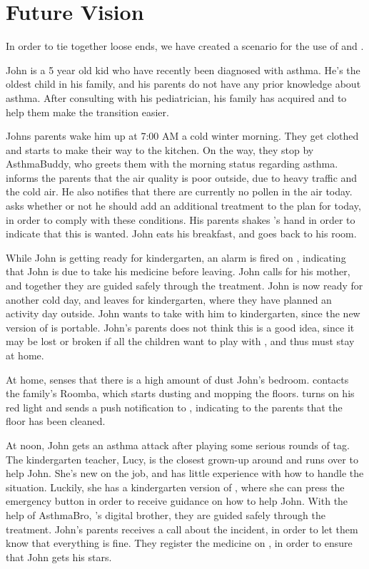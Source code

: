 \section{Future Vision}
\label{sec:futurevision}

In order to tie together loose ends, we have created a scenario for the use of \app{} and \buddy{}.

John is a 5 year old kid who have recently been diagnosed with asthma. He's the oldest child in his family, and his parents do not have any prior knowledge about asthma. After consulting with his pediatrician, his family has acquired \buddy{} and \app{} to help them make the transition easier. 

Johns parents wake him up at 7:00 AM a cold winter morning. They get clothed and starts to make their way to the kitchen. On the way, they stop by AsthmaBuddy, who greets them with the morning status regarding asthma. \buddy{} informs the parents that the air quality is poor outside, due to heavy traffic and the cold air. He also notifies that there are currently no pollen in the air today. \buddy{} asks whether or not he should add an additional treatment to the plan for today, in order to comply with these conditions. His parents shakes \buddy{}'s hand in order to indicate that this is wanted. John eats his breakfast, and goes back to his room. 

While John is getting ready for kindergarten, an alarm is fired on \buddy{}, indicating that John is due to take his medicine before leaving. John calls for his mother, and together they are guided safely through the treatment. John is now ready for another cold day, and leaves for kindergarten, where they have planned an activity day outside. John wants to take \ab{} with him to kindergarten, since the new version of \ab{} is portable. John's parents does not think this is a good idea, since it may be lost or broken if all the children want to play with \ab{}, and thus \ab{} must stay at home.

At home, \buddy{} senses that there is a high amount of dust John's bedroom. \buddy{} contacts the family's Roomba, which starts dusting and mopping the floors. \buddy{} turns on his red light and sends a push notification to \app{}, indicating to the parents that the floor has been cleaned. 

At noon, John gets an asthma attack after playing some serious rounds of tag. The kindergarten teacher, Lucy, is the closest grown-up around and runs over to help John. She's new on the job, and has little experience with how to handle the situation. Luckily, she has a kindergarten version of \app{}, where she can press the emergency button in order to receive guidance on how to help John. With the help of AsthmaBro, \buddy{}'s digital brother, they are guided safely through the treatment. John's parents receives a call about the incident, in order to let them know that everything is fine. They register the medicine on \app{}, in order to ensure that John gets his stars.

